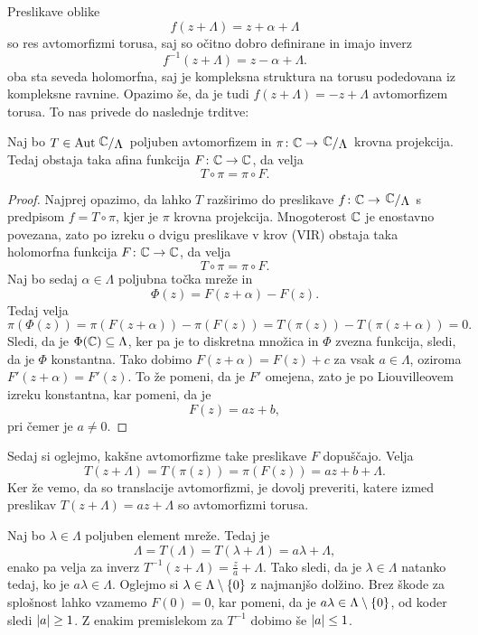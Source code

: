 

Preslikave oblike
\[
f(z + \Lambda) = z + \alpha + \Lambda
\]
so res avtomorfizmi torusa, saj so očitno dobro definirane in imajo
inverz
\[
f^{-1}(z + \Lambda) = z-\alpha + \Lambda.
\]
oba sta seveda holomorfna, saj je kompleksna struktura na torusu
podedovana iz kompleksne ravnine. Opazimo še, da je tudi
$f(z + \Lambda) = -z + \Lambda$ avtomorfizem torusa. To nas privede
do naslednje trditve:

\begin{trditev}
Naj bo $T \in \Aut \kvoc{\C}{\Lambda}$ poljuben avtomorfizem in
$\pi \colon \C \to \kvoc{\C}{\Lambda}$ krovna projekcija. Tedaj
obstaja taka afina funkcija $F \colon \mathbb{C} \to \mathbb{C}$, da velja
\[
T \circ \pi = \pi \circ F.
\]
\end{trditev}

\begin{proof}
Najprej opazimo, da lahko $T$ razširimo do preslikave
$f \colon \C \to \kvoc{\C}{\Lambda}$ s predpisom $f = T \circ \pi$,
kjer je $\pi$ krovna projekcija. Mnogoterost $\mathbb{C}$ je enostavno
povezana, zato po izreku o dvigu preslikave v krov (VIR) obstaja
taka holomorfna funkcija $F \colon \mathbb{C} \to \mathbb{C}$, da velja
\[
T \circ \pi = \pi \circ F.
\]
Naj bo sedaj $\alpha \in \Lambda$ poljubna točka mreže in
\[
\Phi(z) = F(z + \alpha) - F(z).
\]
Tedaj velja
\[
\pi(\Phi(z)) =
\pi(F(z + \alpha)) - \pi(F(z)) =
T(\pi(z)) - T(\pi(z + \alpha)) =
0.
\]
Sledi, da je $\Phi(\mathbb{C}) \subseteq \Lambda$, ker pa je to diskretna
množica in $\Phi$ zvezna funkcija, sledi, da je $\Phi$ konstantna.
Tako dobimo $F(z + \alpha) = F(z) + c$ za vsak $a \in \Lambda$,
oziroma $F'(z + \alpha) = F'(z)$. To že pomeni, da je $F'$ omejena,
zato je po Liouvilleovem izreku konstantna, kar pomeni, da je
\[
F(z) = az + b,
\]
pri čemer je $a \ne 0$.
\end{proof}

Sedaj si oglejmo, kakšne avtomorfizme take preslikave $F$
dopuščajo. Velja
\[
T(z + \Lambda) = T(\pi(z)) = \pi(F(z)) = az + b + \Lambda.
\]
Ker že vemo, da so translacije avtomorfizmi, je dovolj preveriti,
katere izmed preslikav $T(z + \Lambda) = az + \Lambda$ so
avtomorfizmi torusa.

Naj bo $\lambda \in \Lambda$ poljuben element mreže. Tedaj je
\[
\Lambda = T(\Lambda) = T(\lambda + \Lambda) = a\lambda + \Lambda,
\]
enako pa velja za inverz
$T^{-1}(z + \Lambda) = \frac{z}{a} + \Lambda$. Tako sledi, da je
$\lambda \in \Lambda$ natanko tedaj, ko je $a \lambda \in \Lambda$.
Oglejmo si $\lambda \in \Lambda \setminus \left\{0\right\}$ z najmanjšo
dolžino. Brez škode za splošnost lahko vzamemo $F(0) = 0$, kar
pomeni, da je $a \lambda \in \Lambda \setminus \left\{0\right\}$, od koder
sledi $\left\lvert a\right\rvert \geq 1$. Z enakim premislekom za $T^{-1}$ dobimo še
$\left\lvert a\right\rvert \leq 1$.

